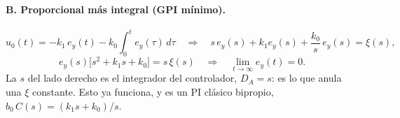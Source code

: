 \paragraph{B. Proporcional más integral (GPI mínimo).}
\begin{equation}
u_0(t) = -k_1\,e_y(t) - k_0\!\int_0^t\! e_y(\tau)\,d\tau
\quad\Longrightarrow\quad
s\,e_y(s) + k_1 e_y(s) + \frac{k_0}{s}\,e_y(s) = \xi(s) ,
\label{eq:gpi_pi}
\end{equation}
\begin{equation}
e_y(s)\bigl[s^2 + k_1 s + k_0\bigr] = s\,\xi(s)
\quad\Longrightarrow\quad
\lim_{t\to\infty} e_y(t) = 0 .
\end{equation}
La $s$ del lado derecho es el integrador del controlador, $D_A = s$: es lo que
anula una $\xi$ constante. Esto ya funciona, y es un PI clásico bipropio,
$b_0\,C(s) = (k_1 s + k_0)/s$.

